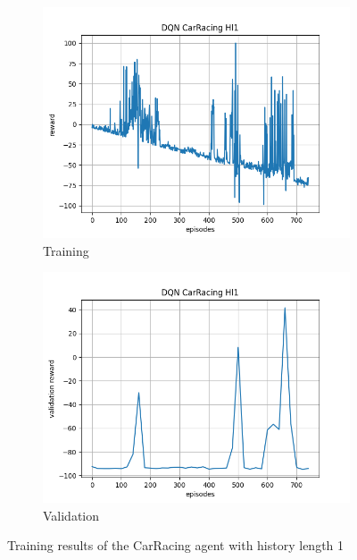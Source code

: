 \documentclass[10pt]{scrartcl}
\begin{document}
\begin{figure}[h]
    \begin{subfigure}{0.5\textwidth}
      \centering
      \includegraphics[width=\linewidth]{images/RL_hl1.png}
      \caption{Training}
      \label{fig:RL_hl1_train}
    \end{subfigure} 
    \begin{subfigure}{0.5\textwidth}
      \centering
      \includegraphics[width=\linewidth]{images/RL_hl1_val.png}
      \caption{Validation}
      \label{fig:RL_hl1_val}
    \end{subfigure}
    \caption{Training results of the CarRacing agent with history length 1}
    \label{fig:Rl_hl1}
\end{figure}
\end{document}
